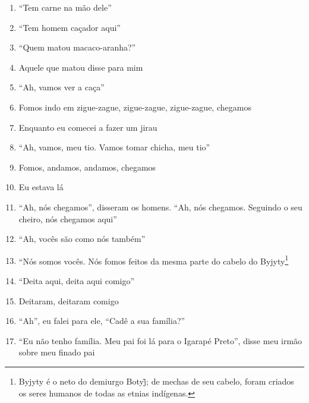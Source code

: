 \begin{enumerate}
 \item ``Tem carne na mão dele''

 \item ``Tem homem caçador aqui''

 \item ``Quem matou macaco-aranha?''

 \item Aquele que matou disse para mim

 \item ``Ah, vamos ver a caça''

 \item Fomos indo em zigue-zague, zigue-zague, zigue-zague, chegamos

 \item Enquanto eu comecei a fazer um jirau

 \item ``Ah, vamos, meu tio. Vamos tomar chicha, meu tio''

 \begin{center}\end{center}

 \item Fomos, andamos, andamos, chegamos

 \item Eu estava lá

 \item ``Ah, nós chegamos'', disseram os homens. ``Ah, nós chegamos.
 Seguindo o seu cheiro, nós chegamos aqui''

 \item ``Ah, vocês são como nós também''

 \item ``Nós somos vocês. Nós fomos feitos da mesma parte do cabelo do
 Byjyty\footnote{Byjyty é o neto do demiurgo Botyj̃;  de mechas de seu
   cabelo, foram criados os seres humanos de todas as etnias indígenas.}

 \item ``Deita aqui, deita aqui comigo''

 \item Deitaram, deitaram comigo

 \item ``Ah'', eu falei para ele, ``Cadê a sua família?''

 \item ``Eu não tenho família. Meu pai foi lá para o Igarapé Preto'', disse
 meu irmão sobre meu finado pai

 \begin{center}\end{center}


\end{enumerate}
